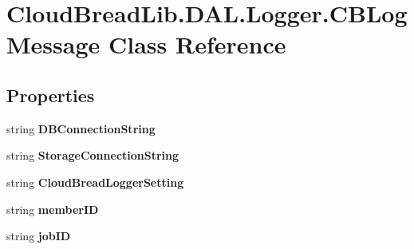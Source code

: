 \hypertarget{class_cloud_bread_lib_1_1_d_a_l_1_1_logger_1_1_c_b_log_message}{}\section{Cloud\+Bread\+Lib.\+D\+A\+L.\+Logger.\+C\+B\+Log\+Message Class Reference}
\label{class_cloud_bread_lib_1_1_d_a_l_1_1_logger_1_1_c_b_log_message}
\subsection*{Properties}
\begin{DoxyCompactItemize}
\item 
string {\bfseries D\+B\+Connection\+String}\hypertarget{class_cloud_bread_lib_1_1_d_a_l_1_1_logger_1_1_c_b_log_message_ae2a4b77a45768901d3b3fb1d9ad56999}{}\label{class_cloud_bread_lib_1_1_d_a_l_1_1_logger_1_1_c_b_log_message_ae2a4b77a45768901d3b3fb1d9ad56999}

\item 
string {\bfseries Storage\+Connection\+String}\hypertarget{class_cloud_bread_lib_1_1_d_a_l_1_1_logger_1_1_c_b_log_message_aecdb4b5d752435d17102110ef8d68d60}{}\label{class_cloud_bread_lib_1_1_d_a_l_1_1_logger_1_1_c_b_log_message_aecdb4b5d752435d17102110ef8d68d60}

\item 
string {\bfseries Cloud\+Bread\+Logger\+Setting}\hypertarget{class_cloud_bread_lib_1_1_d_a_l_1_1_logger_1_1_c_b_log_message_a27b68a579fcdc11169ba6f051305cc4e}{}\label{class_cloud_bread_lib_1_1_d_a_l_1_1_logger_1_1_c_b_log_message_a27b68a579fcdc11169ba6f051305cc4e}

\item 
string {\bfseries member\+ID}\hypertarget{class_cloud_bread_lib_1_1_d_a_l_1_1_logger_1_1_c_b_log_message_ae5b221a36696db8245a90a1d741f2e93}{}\label{class_cloud_bread_lib_1_1_d_a_l_1_1_logger_1_1_c_b_log_message_ae5b221a36696db8245a90a1d741f2e93}

\item 
string {\bfseries job\+ID}\hypertarget{class_cloud_bread_lib_1_1_d_a_l_1_1_logger_1_1_c_b_log_message_a06a5091b929c6272fd58ff41c11dc837}{}\label{class_cloud_bread_lib_1_1_d_a_l_1_1_logger_1_1_c_b_log_message_a06a5091b929c6272fd58ff41c11dc837}


\end{DoxyCompactItemize}
